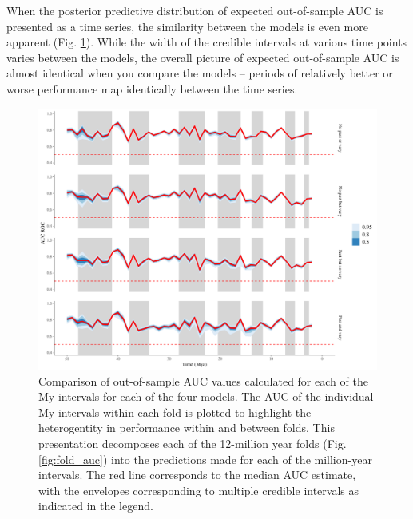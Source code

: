 \documentclass[12pt,letterpaper]{article}
\begin{document}
When the posterior predictive distribution of expected out-of-sample AUC is presented as a time series, the similarity between the models is even more apparent (Fig. \ref{fig:fold_auc_time}). While the width of the credible intervals at various time points varies between the models, the overall picture of expected out-of-sample AUC is almost identical when you compare the models -- periods of relatively better or worse performance map identically between the time series.
\begin{figure}[ht]
  \centering
  \includegraphics[width=\textwidth,height=0.5\textheight,keepaspectratio=true]{../results/figure/fold_auc_time}
  \caption{Comparison of out-of-sample AUC values calculated for each of the My intervals for each of the four models. The AUC of the individual My intervals within each fold is plotted to highlight the heterogentity in performance within and between folds. This presentation decomposes each of the 12-million year folds (Fig. \ref{fig:fold_auc}) into the predictions made for each of the million-year intervals. The red line corresponds to the median AUC estimate, with the envelopes corresponding to multiple credible intervals as indicated in the legend.}
  \label{fig:fold_auc_time}
\end{figure}
\end{document}
